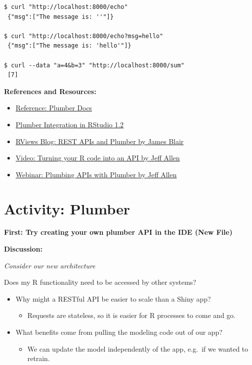 \documentclass[]{book}
\providecommand{\tightlist}{%
  \setlength{\itemsep}{0pt}\setlength{\parskip}{0pt}}
\theoremstyle{definition}
\theoremstyle{definition}
\theoremstyle{definition}
\theoremstyle{remark}
\begin{document}
\begin{verbatim}
$ curl "http://localhost:8000/echo"
 {"msg":["The message is: ''"]}
 
$ curl "http://localhost:8000/echo?msg=hello"
 {"msg":["The message is: 'hello'"]}
 
$ curl --data "a=4&b=3" "http://localhost:8000/sum"
 [7]
\end{verbatim}

\textbf{References and Resources:}

\begin{itemize}
\tightlist
\item
  \href{https://www.rplumber.io/}{Reference: Plumber Docs}
\item
  \href{https://blog.rstudio.com/2018/10/23/rstudio-1-2-preview-plumber-integration/}{Plumber
  Integration in RStudio 1.2}
\item
  \href{https://rviews.rstudio.com/2018/07/23/rest-apis-and-plumber/}{RViews
  Blog: REST APIs and Plumber by James Blair}
\item
  \href{https://www.rstudio.com/resources/videos/plumber-turning-your-r-code-into-an-api/}{Video:
  Turning your R code into an API by Jeff Allen}
\item
  \href{https://www.rstudio.com/resources/videos/plumbing-apis-with-plumber/}{Webinar:
  Plumbing APIs with Plumber by Jeff Allen}
\end{itemize}

\hypertarget{activity-plumber}{%
\section{Activity: Plumber}\label{activity-plumber}}

\textbf{First: Try creating your own plumber API in the IDE (New File)}

\textbf{Discussion:}

\emph{Consider our new architecture}

Does my R functionality need to be accessed by other systems?

\begin{itemize}
\tightlist
\item
  Why might a RESTful API be easier to scale than a Shiny app?

  \begin{itemize}
  \tightlist
  \item
    Requests are stateless, so it is easier for R processes to come and
    go.
  \end{itemize}
\item
  What benefits come from pulling the modeling code out of our app?

  \begin{itemize}
  \tightlist
  \item
    We can update the model independently of the app, e.g.~if we wanted
    to retrain.
  \end{itemize}
\end{itemize}
\end{document}
